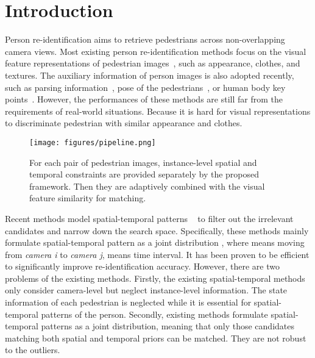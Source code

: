 \documentclass[10pt,twocolumn,letterpaper]{article}
\begin{document}
\section{Introduction}

Person re-identification aims to retrieve pedestrians across non-overlapping camera views. Most existing person re-identification methods focus on the visual feature representations of pedestrian images~\cite{2015An, 2018Learning, he2020fastreid, 2015Learning, 2016Person, Lin2017Deep, 2017Beyond, Chen2020Salience, 2016Deep}, such as appearance, clothes, and textures.
The auxiliary information of person images is also adopted recently, such as parsing information~\cite{ Song2018Mask,He2018CVPR, 2020Foreground, 2018MaskReID, Kalayeh2018Human}, pose of the pedestrians~\cite{Su2017Learning, 2019Pose, 2018Pose}, or human body key points~\cite{Wang2020High}. 
However, the performances of these methods are still far from the requirements of real-world situations.
Because it is hard for visual representations to discriminate pedestrian with similar appearance and clothes.


\begin{figure}[t]
\begin{center}
   \texttt{[image: figures/pipeline.png]}
\end{center}
   \caption{For each pair of pedestrian images, instance-level spatial and temporal constraints are provided separately by the proposed framework. Then they are adaptively combined with the visual feature similarity for matching.}
\label{fig:pipeline}
\vspace{-0.3cm}
\end{figure}





Recent methods model spatial-temporal patterns ~\cite{guangcong2019aaai, 2018Unsupervised, 2017Joint, 2016Camera} to filter out the irrelevant candidates and narrow down the search space.
Specifically, these methods mainly formulate spatial-temporal pattern as a joint distribution , where  means moving from \textit{camera i} to \textit{camera j},  means time interval.
It has been proven to be efficient to significantly improve re-identification accuracy.
However, there are two problems of the existing methods.
Firstly, the existing spatial-temporal methods only consider camera-level but neglect instance-level information.
The state information of each pedestrian is neglected while it is essential for spatial-temporal patterns of the person.
Secondly, existing methods formulate spatial-temporal patterns as a joint distribution, meaning that only those candidates matching both spatial and temporal priors can be matched. 
They are not robust to the outliers.
\end{document}
